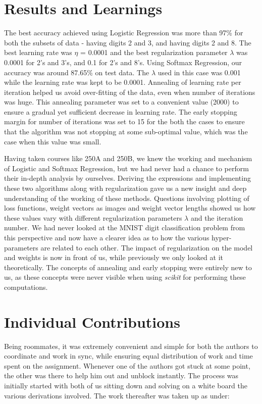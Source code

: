 \documentclass{article}
\begin{document}
\section{Results and Learnings}
The best accuracy achieved using Logistic Regression was more than 97\% for both the subsets of data - having digits 2 and 3, and having digits 2 and 8. The best learning rate was $\eta$ = 0.0001 and the best regularization parameter $\lambda$ was 0.0001 for 2’s and 3’s, and 0.1 for 2’s and 8’s. Using Softmax Regression, our accuracy was around 87.65\% on test data. The $\lambda$ used in this case was 0.001 while the learning rate was kept to be 0.0001. Annealing of learning rate per iteration helped us avoid over-fitting of the data, even when number of iterations was huge. This annealing parameter was set to a convenient value (2000) to ensure a gradual yet sufficient decrease in learning rate. The early stopping margin for number of iterations was set to 15 for the both the cases to ensure that the algorithm was not stopping at some sub-optimal value, which was the case when this value was small.

Having taken courses like 250A and 250B, we knew the working and mechanism of Logistic and Softmax Regression, but we had never had a chance to perform their in-depth analysis by ourselves. Deriving the expressions and implementing these two algorithms along with regularization gave us a new insight and deep understanding of the working of these methods. Questions involving plotting of loss functions, weight vectors as images and weight vector lengths showed us how these values vary with different regularization parameters $\lambda$ and the iteration number. We had never looked at the MNIST digit classification problem from this perspective and now have a clearer idea as to how the various hyper-parameters are related to each other. The impact of regularization on the model and weights is now in front of us, while previously we only looked at it theoretically. The concepts of annealing and early stopping were entirely new to us, as these concepts were never visible when using \emph{scikit} for performing these computations.
\section{Individual Contributions}
Being roommates, it was extremely convenient and simple for both the authors to coordinate and work in sync, while ensuring equal distribution of work and time spent on the assignment. Whenever one of the authors got stuck at some point, the other was there to help him out and unblock instantly. The process was initially started with both of us sitting down and solving on a white board the various derivations involved. The work thereafter was taken up as under:
\end{document}
